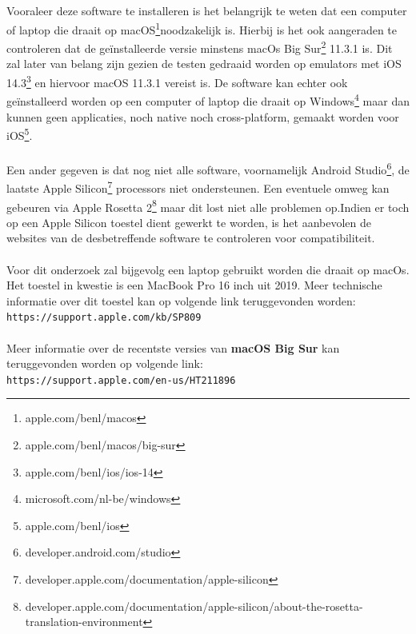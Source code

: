     \subsection{}
    \label{sec:I-hardware}
    Vooraleer deze software te installeren is het belangrijk te weten dat een computer of laptop die draait op macOS\footnote{apple.com/benl/macos}noodzakelijk is. Hierbij is het ook aangeraden te controleren dat de geïnstalleerde versie minstens macOs Big Sur\footnote{apple.com/benl/macos/big-sur} 11.3.1 is. Dit zal later van belang zijn gezien de testen gedraaid worden op emulators met  iOS 14.3\footnote{apple.com/benl/ios/ios-14} en hiervoor macOS 11.3.1 vereist is. De software kan echter ook geïnstalleerd worden op een computer of laptop die draait op Windows\footnote{microsoft.com/nl-be/windows} maar dan kunnen geen applicaties, noch native noch cross-platform, gemaakt worden voor iOS\footnote{apple.com/benl/ios}.
    \\ \\
    Een ander gegeven is dat nog niet alle software, voornamelijk Android Studio\footnote{developer.android.com/studio}, de laatste Apple Silicon\footnote{developer.apple.com/documentation/apple-silicon} processors niet ondersteunen. Een eventuele omweg kan gebeuren via Apple Rosetta 2\footnote{developer.apple.com/documentation/apple-silicon/about-the-rosetta-translation-environment} maar dit lost niet alle problemen op.Indien er toch op een Apple Silicon toestel dient gewerkt te worden, is het aanbevolen de websites van de desbetreffende software te controleren voor compatibiliteit.  
    \\ \\
    Voor dit onderzoek zal bijgevolg een laptop gebruikt worden die draait op macOs. Het toestel in kwestie is een MacBook Pro 16 inch uit 2019.
    Meer technische informatie over dit toestel kan op volgende link teruggevonden worden:\\
    \verb*|https://support.apple.com/kb/SP809|
    \\ \\
    Meer informatie over de recentste versies van \textbf{macOS Big Sur} kan teruggevonden worden op volgende link:\\
    \verb*|https://support.apple.com/en-us/HT211896|


